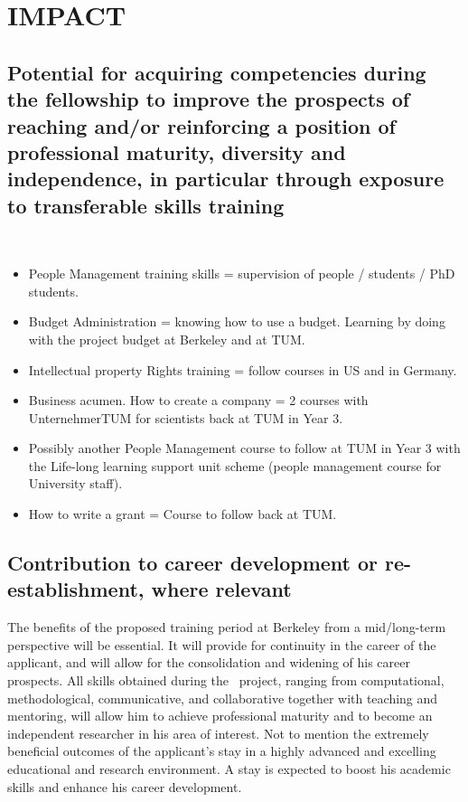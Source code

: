 \section{IMPACT} %
\label{sec:impact}
\subsection{Potential for acquiring competencies during the fellowship to improve the prospects of 
reaching and/or reinforcing a position of professional maturity, diversity and independence, 
in particular through exposure to transferable skills training}
\\
\begin{itemize}
\item People Management training skills = supervision of people / students / PhD students. 
\item Budget Administration = knowing how to use a budget. Learning by doing with the project budget at Berkeley and at TUM.
\item Intellectual property Rights training = follow courses in US and in Germany.
\item Business acumen. How to create a company = 2 courses with UnternehmerTUM for scientists back at TUM in Year 3.
\item Possibly another People Management course to follow at TUM in Year 3 with the Life-long learning support unit scheme (people management course for University staff).
\item How to write a grant = Course to follow back at TUM.
\end{itemize}
\subsection{Contribution to career development or re-establishment, where relevant}
The benefits of the proposed training period at Berkeley from a mid/long-term perspective will 
be essential. It will provide for continuity in the career of the applicant, and will allow for the consolidation and 
widening of his career prospects. All skills obtained during the \ksem\ project, ranging 
from computational, methodological, communicative, and collaborative together with 
teaching and mentoring, will allow him to achieve professional maturity and to become an 
independent researcher in his area of interest. Not to mention the extremely beneficial 
outcomes of the applicant's stay in a highly advanced and excelling educational  and 
research environment. A stay is expected to boost his academic skills and enhance his career development.

